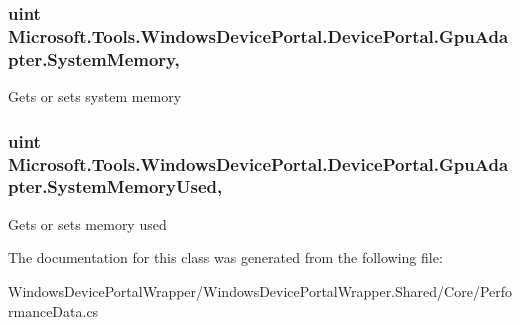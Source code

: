 \subsubsection[{\texorpdfstring{System\+Memory}{SystemMemory}}]{\setlength{\rightskip}{0pt plus 5cm}uint Microsoft.\+Tools.\+Windows\+Device\+Portal.\+Device\+Portal.\+Gpu\+Adapter.\+System\+Memory\hspace{0.3cm}{\ttfamily [get]}, {\ttfamily [set]}}\hypertarget{class_microsoft_1_1_tools_1_1_windows_device_portal_1_1_device_portal_1_1_gpu_adapter_a626b502b200b65271325de7e7d150941}{}\label{class_microsoft_1_1_tools_1_1_windows_device_portal_1_1_device_portal_1_1_gpu_adapter_a626b502b200b65271325de7e7d150941}


Gets or sets system memory 

\subsubsection[{\texorpdfstring{System\+Memory\+Used}{SystemMemoryUsed}}]{\setlength{\rightskip}{0pt plus 5cm}uint Microsoft.\+Tools.\+Windows\+Device\+Portal.\+Device\+Portal.\+Gpu\+Adapter.\+System\+Memory\+Used\hspace{0.3cm}{\ttfamily [get]}, {\ttfamily [set]}}\hypertarget{class_microsoft_1_1_tools_1_1_windows_device_portal_1_1_device_portal_1_1_gpu_adapter_a64c1c59a2e36f629ed512fb014c4da9b}{}\label{class_microsoft_1_1_tools_1_1_windows_device_portal_1_1_device_portal_1_1_gpu_adapter_a64c1c59a2e36f629ed512fb014c4da9b}


Gets or sets memory used 



The documentation for this class was generated from the following file\+:\begin{DoxyCompactItemize}
\item 
Windows\+Device\+Portal\+Wrapper/\+Windows\+Device\+Portal\+Wrapper.\+Shared/\+Core/Performance\+Data.\+cs\end{DoxyCompactItemize}
